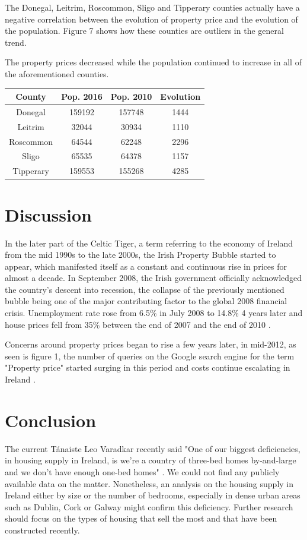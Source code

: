 \documentclass[twocolumn]{article}
\begin{document}
The Donegal, Leitrim, Roscommon, Sligo and Tipperary counties actually have a negative correlation between the evolution of property price and the evolution of the population. Figure 7 shows how these counties are outliers in the general trend.

The property prices decreased while the population continued to increase in all of the aforementioned counties.

\begin{center}
\begin{tabular}{||c c c c||}
 \hline
 County & Pop. 2016 & Pop. 2010 & Evolution \\ [0.5ex]
 \hline\hline
 Donegal & 159192 & 157748 & 1444 \\
 \hline
 Leitrim & 32044 & 30934 & 1110 \\
 \hline
 Roscommon & 64544 & 62248 & 2296 \\
 \hline
 Sligo & 65535 & 64378 & 1157 \\
 \hline
 Tipperary & 159553 & 155268 & 4285 \\ [1ex]
 \hline
\end{tabular}
\end{center}

\section{Discussion\label{s:discuss}}

In the later part of the Celtic Tiger, a term referring to the economy of Ireland from the mid 1990s to the late 2000s, the Irish Property Bubble started to appear, which manifested itself as a constant and continuous rise in prices for almost a decade. In September 2008, the Irish government officially acknowledged the country's descent into recession\cite{kollewe08}, the collapse of the previously mentioned bubble being one of the major contributing factor to the global 2008 financial crisis. Unemployment rate rose from 6.5\% in July 2008 to 14.8\% 4 years later \cite{cso14} and house prices fell from 35\% between the end of 2007 and the end of 2010 \cite{environ10}.

Concerns around property prices began to rise a few years later, in mid-2012, as seen is figure 1, the number of queries on the Google search engine for the term "Property price" started surging in this period and costs continue escalating in Ireland \cite{kennedy21}.

\section{Conclusion}
The current Tánaiste Leo Varadkar recently said "One of our biggest deficiencies, in housing supply in Ireland, is we're a country of three-bed homes by-and-large and we don't have enough one-bed homes" \cite{mcgrath21}. We could not find any publicly available data on the matter. Nonetheless, an analysis on the housing supply in Ireland either by size or the number of bedrooms, especially in dense urban areas such as Dublin, Cork or Galway might confirm this deficiency. Further research should focus on the types of housing that sell the most and that have been constructed recently.
\end{document}
